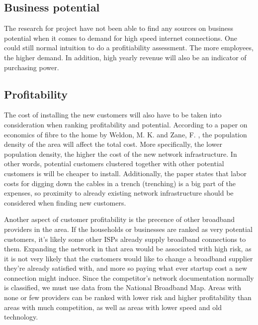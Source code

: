 \documentclass[twocolumn]{article}
\begin{document}
\subsection{Business potential}
\label{sub:Businesses}
The research for project have not been able to find any sources on business potential when it comes to demand for high speed internet connections. One could still normal intuition to do a profitiability assessment. The more employees, the higher demand. In addition, high yearly revenue will also be an indicator of purchasing power.

\subsection{Profitability}
\label{sub:Profitability}
The cost of installing the new customers will also have to be taken into consideration when ranking profitability and potential. According to a paper on economics of fibre to the home by Weldon, M. K. and Zane, F. \cite{Weldon2003-xq}, the population density of the area will affect the total cost. More specifically, the lower population density, the higher the cost of the new network infrastructure. In other words, potential customers clustered together with other potential customers is will be cheaper to install. Additionally, the paper states that labor costs for digging down the cables in a trench (trenching) is a big part of the expenses, so proximity to already existing network infrastructure should be considered when finding new customers. 

Another aspect of customer profitability is the precence of other broadband providers in the area. If the households or businesses are ranked as very potential customers, it's likely some other ISPs already supply broadband connections to them. Expanding the network in that area would be associated with high risk, as it is not very likely that the customers would like to change a broadband supplier they're already satisfied with, and more so paying what ever startup cost a new connection might induce. Since the competitor's network documentation normally is classified, we must use data from the National Broadband Map. Areas with none or few providers can be ranked with lower risk and higher profitability than areas with much competition, as well as areas with lower speed and old technology.
\end{document}
